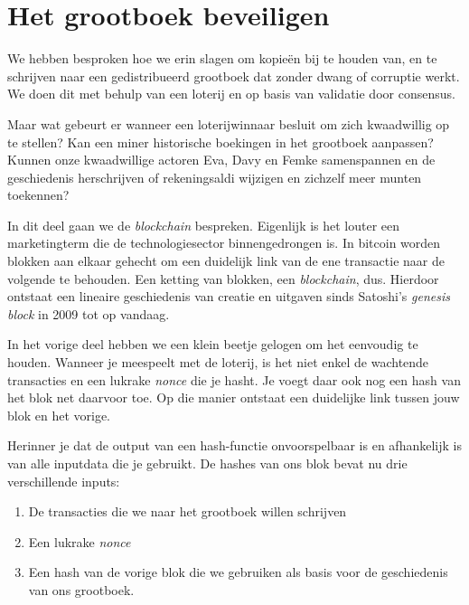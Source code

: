 
\chapter{Het grootboek beveiligen}
We hebben besproken hoe we erin slagen om kopieën bij te houden van, en te schrijven naar een gedistribueerd grootboek dat zonder dwang of corruptie werkt. We doen dit met behulp van een loterij en op basis van validatie door consensus.

Maar wat gebeurt er wanneer een loterijwinnaar besluit om zich kwaadwillig op te stellen? Kan een miner historische boekingen in het grootboek aanpassen? Kunnen onze kwaadwillige actoren Eva, Davy en Femke samenspannen en de geschiedenis herschrijven of rekeningsaldi wijzigen en zichzelf meer munten toekennen?

In dit deel gaan we de \textit{blockchain} bespreken. Eigenlijk is het louter een marketingterm die de technologiesector binnengedrongen is. In bitcoin worden blokken aan elkaar gehecht om een duidelijk link van de ene transactie naar de volgende te behouden. Een ketting van blokken, een \textit{blockchain}, dus. Hierdoor ontstaat een lineaire geschiedenis van creatie en uitgaven sinds Satoshi’s \textit{genesis block} in 2009 tot op vandaag.

In het vorige deel hebben we een klein beetje gelogen om het eenvoudig te houden. Wanneer je meespeelt met de loterij, is het niet enkel de wachtende transacties en een lukrake \textit{nonce} die je hasht. Je voegt daar ook nog een hash van het blok net daarvoor toe. Op die manier ontstaat een duidelijke link tussen jouw blok en het vorige.

\clearpage
Herinner je dat de output van een hash-functie onvoorspelbaar is en afhankelijk is van alle inputdata die je gebruikt. De hashes van ons blok bevat nu drie verschillende inputs:

\begin{enumerate}
    \item De transacties die we naar het grootboek willen schrijven
    \item Een lukrake \textit{nonce}
    \item Een hash van de vorige blok die we gebruiken als basis voor de geschiedenis van ons grootboek.
\end{enumerate}




